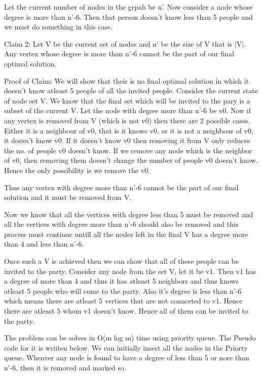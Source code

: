 \documentclass{article}
\begin{document}
Let the current number of nodes in the grpah be n'. Now consider a node whose degree is more than n'-6. Then that person doesn't know less than 5 people and we must do something in this case. 

Claim 2: Let V be the current set of nodes and n' be the size of V that is |V|. Any vertex whose degree is more than n'-6 cannot be the part of our final optimal solution. 

Proof of Claim: We will show that their is no final optimal solution in which it doesn't know atleast 5 people of all the invited people. Consider the current state of node set V. We know that the final set which will be invited to the pary is a subset of the current V. Let the node with degree more than n'-6 be v0. Now if any vertex is removed from V (which is not v0) then there are 2 possible cases. Either it is a neighbour of v0, that is it knows v0, or it is not a neighbour of v0, it doesn't know v0. If it doesn't know v0 then removing it from V only reduces the no. of people v0 doesn't know. If we remove any node which is the neighbor of v0, then removing them doesn't change the number of people v0 doesn't know. Hence the only possibility is we remove the v0.

Thus any vertex with degree more than n'-6 cannot be the part of our final solution and it must be removed from V.

Now we know that all the vertices with degree less than 5 must be removed and all the vertices with degree more than n'-6 should also be removed and this process must continue untill all the nodes left in the final V has a degree more than 4 and less than n'-6. 

Once such a V is achieved then we can show that all of these people can be invited to the party. Consider any node from the set V, let it be v1. Then v1 has a degree of more than 4 and thus it has atleast 5 neighbors and thus knows atleast 5 people who will come to the party. Also it's degree is less than n'-6 which means there are atleast 5 vertices that are not connceted to v1. Hence there are atleast 5 whom v1 doesn't know. Hence all of them can be invited to the party.

The problem can be solves in O(m log m) time using priority queue. The Pseudo code for it is wriiten below. We can initially insert all the nodes in the Priorty queue. Whenver any node is found to have a degree of less than 5 or nore than n'-6, then it is removed and marked so.  

\subsection{}
\end{document}
